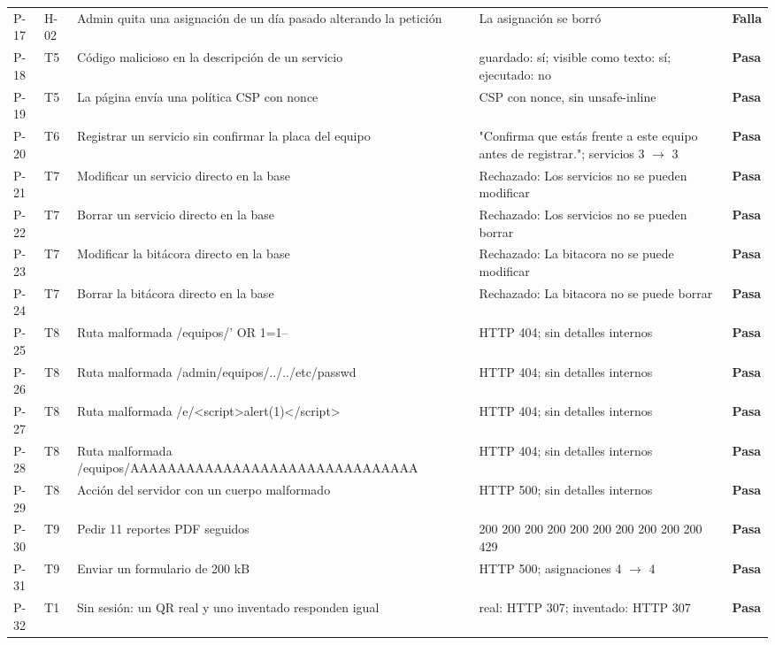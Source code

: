 \documentclass[12pt, letterpaper]{article}
\begin{document}
\begin{longtable}{L{0.07}L{0.08}L{0.36}L{0.34}L{0.08}}
P-17 & H-02 & Admin quita una asignación de un día pasado alterando la petición & La asignación se borró & \textbf{\textcolor{red!70!black}{Falla}} \\
P-18 & T5 & Código malicioso en la descripción de un servicio & guardado: sí; visible como texto: sí; ejecutado: no & \textbf{Pasa} \\
P-19 & T5 & La página envía una política CSP con nonce & CSP con nonce, sin unsafe-inline & \textbf{Pasa} \\
P-20 & T6 & Registrar un servicio sin confirmar la placa del equipo & "Confirma que estás frente a este equipo antes de registrar."; servicios 3 $\rightarrow$ 3 & \textbf{Pasa} \\
P-21 & T7 & Modificar un servicio directo en la base & Rechazado: Los servicios no se pueden modificar & \textbf{Pasa} \\
P-22 & T7 & Borrar un servicio directo en la base & Rechazado: Los servicios no se pueden borrar & \textbf{Pasa} \\
P-23 & T7 & Modificar la bitácora directo en la base & Rechazado: La bitacora no se puede modificar & \textbf{Pasa} \\
P-24 & T7 & Borrar la bitácora directo en la base & Rechazado: La bitacora no se puede borrar & \textbf{Pasa} \\
P-25 & T8 & Ruta malformada /equipos/' OR 1=1-- & HTTP 404; sin detalles internos & \textbf{Pasa} \\
P-26 & T8 & Ruta malformada /admin/equipos/../../etc/passwd & HTTP 404; sin detalles internos & \textbf{Pasa} \\
P-27 & T8 & Ruta malformada /e/\textless{}script\textgreater{}alert(1)\textless{}/script\textgreater{} & HTTP 404; sin detalles internos & \textbf{Pasa} \\
P-28 & T8 & Ruta malformada /equipos/AAAAAAAAAAAAAAAAAAAAAAAAAAAAAAA & HTTP 404; sin detalles internos & \textbf{Pasa} \\
P-29 & T8 & Acción del servidor con un cuerpo malformado & HTTP 500; sin detalles internos & \textbf{Pasa} \\
P-30 & T9 & Pedir 11 reportes PDF seguidos & 200 200 200 200 200 200 200 200 200 200 429 & \textbf{Pasa} \\
P-31 & T9 & Enviar un formulario de 200 kB & HTTP 500; asignaciones 4 $\rightarrow$ 4 & \textbf{Pasa} \\
P-32 & T1 & Sin sesión: un QR real y uno inventado responden igual & real: HTTP 307; inventado: HTTP 307 & \textbf{Pasa} \\

\end{longtable}
\end{document}
